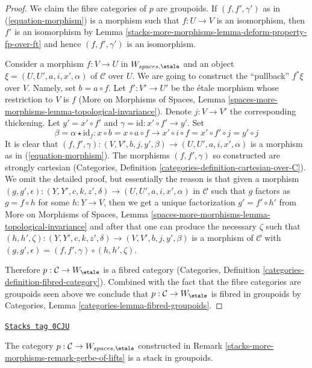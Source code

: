 \begin{proof}
We claim the fibre categories of $p$ are groupoids.
If $(f, f', \gamma')$ as in (\ref{equation-morphism})
is a morphism such that $f : U \to V$ is an isomorphism, then
$f'$ is an isomorphism by Lemma \ref{stacks-more-morphisms-lemma-deform-property-fp-over-ft}
and hence $(f, f', \gamma')$ is an isomorphism.

\medskip\noindent
Consider a morphism $f : V \to U$ in $W_{spaces, \etale}$
and an object $\xi = (U, U', a, i, x', \alpha)$
of $\mathcal{C}$ over $U$. We are going to construct the ``pullback''
$f^*\xi$ over $V$.
Namely, set $b = a \circ f$. Let $f' : V' \to U'$ be the \'etale morphism
whose restriction to $V$ is $f$ (More on Morphisms of Spaces,
Lemma \ref{spaces-more-morphisms-lemma-topological-invariance}).
Denote $j : V \to V'$ the corresponding thickening.
Let $y' = x' \circ f'$ and $\gamma = \text{id} : x' \circ f' \to y'$.
Set
$$
\beta = \alpha \star \text{id}_f :
x \circ b = x \circ a \circ f \to
x' \circ i \circ f = x' \circ f' \circ j = y' \circ j
$$
It is clear that $(f, f', \gamma) : (V, V', b, j, y', \beta) \to
(U, U', a, i, x', \alpha)$ is a morphism as in
(\ref{equation-morphism}). The morphisms $(f, f', \gamma)$
so constructed are strongly cartesian
(Categories, Definition \ref{categories-definition-cartesian-over-C}).
We omit the detailed proof, but essentially the reason is that
given a morphism
$(g, g', \epsilon) : (Y, Y', c, k, z', \delta) \to (U, U', a, i, x', \alpha)$
in $\mathcal{C}$ such that $g$ factors as $g = f \circ h$ for some
$h : Y \to V$, then we get a unique factorization $g' = f' \circ h'$
from More on Morphisms of Spaces,
Lemma \ref{spaces-more-morphisms-lemma-topological-invariance}
and after that one can produce the necessary $\zeta$ such that
$(h, h', \zeta) :  (Y, Y', c, k, z', \delta) \to
(V, V', b, j, y', \beta)$ is a morphism of $\mathcal{C}$
with $(g, g', \epsilon) = (f, f', \gamma) \circ (h, h', \zeta)$.

\medskip\noindent
Therefore $p : \mathcal{C} \to W_\etale$ is a fibred
category (Categories, Definition \ref{categories-definition-fibred-category}).
Combined with the fact that the fibre categories are groupoids
seen above we conclude that $p : \mathcal{C} \to W_\etale$
is fibred in groupoids by Categories, Lemma
\ref{categories-lemma-fibred-groupoids}.
\end{proof}

\begin{lemma}
\label{stacks-more-morphisms-lemma-gerbe-of-lifts-stack}
\href{https://stacks.math.columbia.edu/tag/0CJU}{\texttt{Stacks tag 0CJU}}

The category $p : \mathcal{C} \to W_{spaces, \etale}$ constructed
in Remark \ref{stacks-more-morphisms-remark-gerbe-of-lifts} is a stack in groupoids.
\end{lemma}

